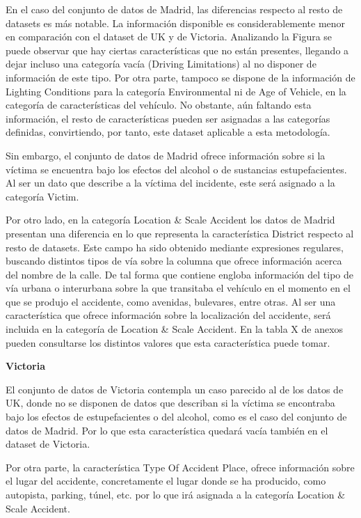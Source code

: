 \documentclass{uathesis-es}
\begin{document}
{En el caso del conjunto de datos de Madrid, las diferencias respecto al resto de datasets es más notable. La información disponible es considerablemente menor en comparación con el dataset de UK y de Victoria. Analizando la Figura se puede observar que hay ciertas características que no están presentes, llegando a dejar incluso una categoría vacía (Driving Limitations) al no disponer de información de este tipo. Por otra parte, tampoco se dispone de la información de Lighting Conditions para la categoría Environmental ni de Age of Vehicle, en la categoría de características del vehículo. No obstante, aún faltando esta información, el resto de características pueden ser asignadas a las categorías definidas, convirtiendo, por tanto, este dataset aplicable a esta metodología.

Sin embargo, el conjunto de datos de Madrid ofrece información sobre si la víctima se encuentra bajo los efectos del alcohol o de sustancias estupefacientes. Al ser un dato que describe a la víctima del incidente, este será asignado a la categoría Victim.

Por otro lado, en la categoría Location \& Scale Accident los datos de Madrid presentan una diferencia en lo que representa la característica District respecto al resto de datasets. Este campo ha sido obtenido mediante expresiones regulares, buscando distintos tipos de vía sobre la columna que ofrece información acerca del nombre de la calle. De tal forma que contiene engloba información del tipo de vía urbana o interurbana sobre la que transitaba el vehículo en el momento en el que se produjo el accidente, como avenidas, bulevares, entre otras. Al ser una característica que ofrece información sobre la localización del accidente, será incluida en la categoría de Location \& Scale Accident. En la tabla X de anexos pueden consultarse los distintos valores que esta característica puede tomar.

\textbf{Victoria}

El conjunto de datos de Victoria contempla un caso parecido al de los datos de UK, donde no se disponen de datos que describan si la víctima se encontraba bajo los efectos de estupefacientes o del alcohol, como es el caso del conjunto de datos de Madrid. Por lo que esta característica quedará vacía también en el dataset de Victoria.

Por otra parte, la característica Type Of Accident Place, ofrece información sobre el lugar del accidente, concretamente el lugar donde se ha producido, como autopista, parking, túnel, etc. por lo que irá asignada a la categoría Location \& Scale Accident.


}
\end{document}
